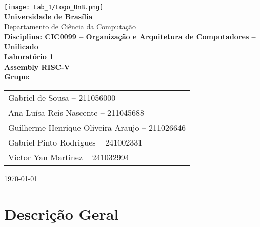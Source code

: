 \documentclass[12pt,a4paper]{article}
\begin{document}
\begin{titlepage}
    \begin{center}
        \vspace*{1cm}
        \texttt{[image: Lab\_1/Logo\_UnB.png]}\\[1cm]

        {\LARGE \textbf{Universidade de Brasília}}\\[4pt]
        {\large Departamento de Ciência da Computação}\\[12pt]
        {\Large \textbf{Disciplina: CIC0099 -- Organização e Arquitetura de Computadores -- Unificado}}\\[20pt]

        {\huge \textbf{Laboratório 1}}\\[6pt]
        {\Large \textbf{Assembly RISC-V}}\\[2cm]

        \textbf{Grupo:} \\[4pt]
        \begin{tabular}{l}
            
            Gabriel de Sousa -- 211056000 \\
            Ana Luísa Reis Nascente -- 211045688 \\
            Guilherme Henrique Oliveira Araujo -- 211026646 \\
            Gabriel Pinto Rodrigues -- 241002331 \\
            Victor Yan Martinez -- 241032994 \\
            
        \end{tabular}

        \vfill

        

        \vspace{0.8cm}
        \today
    \end{center}
\end{titlepage}

\tableofcontents
\newpage


\newpage

\section*{Descrição Geral}
\end{document}
